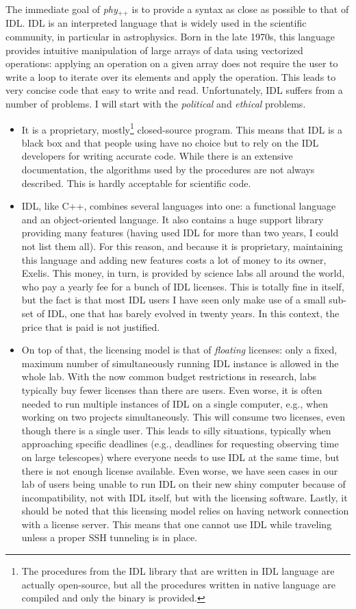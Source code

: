 \documentclass[12pt]{report}
\newcommand{\phypp}{\textit{phy}$_{\text{++}}$\xspace}
\begin{document}
The immediate goal of \phypp is to provide a syntax as close as possible to that of IDL. IDL is an interpreted language that is widely used in the scientific community, in particular in astrophysics. Born in the late 1970s, this language provides intuitive manipulation of large arrays of data using vectorized operations: applying an operation on a given array does not require the user to write a loop to iterate over its elements and apply the operation. This leads to very concise code that easy to write and read. Unfortunately, IDL suffers from a number of problems. I will start with the \emph{political} and \emph{ethical} problems.
\begin{itemize}
\item It is a proprietary, mostly\footnote{The procedures from the IDL library that are written in IDL language are actually open-source, but all the procedures written in native language are compiled and only the binary is provided.} closed-source program. This means that IDL is a black box and that people using have no choice but to rely on the IDL developers for writing accurate code. While there is an extensive documentation, the algorithms used by the procedures are not always described. This is hardly acceptable for scientific code.
\item IDL, like C++, combines several languages into one: a functional language and an object-oriented language. It also contains a huge support library providing many features (having used IDL for more than two years, I could not list them all). For this reason, and because it is proprietary, maintaining this language and adding new features costs a lot of money to its owner, Exelis. This money, in turn, is provided by science labs all around the world, who pay a yearly fee for a bunch of IDL licenses. This is totally fine in itself, but the fact is that most IDL users I have seen only make use of a small sub-set of IDL, one that has barely evolved in twenty years. In this context, the price that is paid is not justified.
\item On top of that, the licensing model is that of \emph{floating} licenses: only a fixed, maximum number of simultaneously running IDL instance is allowed in the whole lab. With the now common budget restrictions in research, labs typically buy fewer licenses than there are users. Even worse, it is often needed to run multiple instances of IDL on a single computer, e.g., when working on two projects simultaneously. This will consume two licenses, even though there is a single user. This leads to silly situations, typically when approaching specific deadlines (e.g., deadlines for requesting observing time on large telescopes) where everyone needs to use IDL at the same time, but there is not enough license available. Even worse, we have seen cases in our lab of users being unable to run IDL on their new shiny computer because of incompatibility, not with IDL itself, but with the licensing software. Lastly, it should be noted that this licensing model relies on having network connection with a license server. This means that one cannot use IDL while traveling unless a proper SSH tunneling is in place.
\end{itemize}
\end{document}
